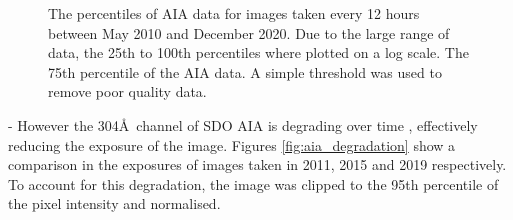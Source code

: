 \documentclass[11pt,a4paper,onecolumn]{report}
\begin{document}







\begin{figure}[t]%
  \centering
  \qquad

  \caption[]{ The percentiles of AIA data for images
  taken every 12 hours between May 2010 and December 2020. Due to the large
  range of data, the 25th to 100th percentiles where plotted on a log scale.
   The 75th percentile of the AIA data. A simple
  threshold was used to remove poor quality data.}
  \label{fig:aia_data_prep}
\end{figure}






- However the 304\AA \ channel of SDO AIA is degrading over time
\citep{boerner_photometric_2014}, effectively reducing the exposure of the
image. Figures \ref{fig:aia_degradation} show a comparison in the exposures of
images taken in 2011, 2015 and 2019 respectively. To account for this
degradation, the image was clipped to the 95th percentile of the pixel
intensity and normalised.
\end{document}
